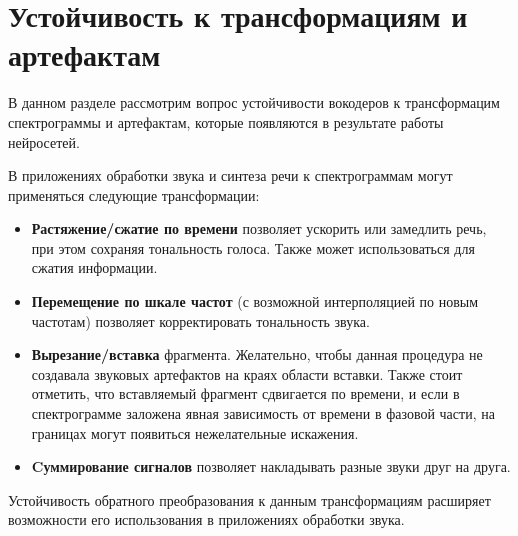 \section{Устойчивость к трансформациям и артефактам}

В данном разделе рассмотрим вопрос устойчивости вокодеров к трансформацим спектрограммы и артефактам, которые появляются в результате работы нейросетей.

В приложениях обработки звука и синтеза речи к спектрограммам могут применяться следующие трансформации:
\begin{itemize}
  \item \textbf{Растяжение/сжатие по времени} позволяет ускорить или замедлить речь, при этом сохраняя тональность голоса. Также может использоваться для сжатия информации.
  \item \textbf{Перемещение по шкале частот} (с возможной интерполяцией по новым частотам) позволяет корректировать тональность звука.
  \item \textbf{Вырезание/вставка} фрагмента. Желательно, чтобы данная процедура не создавала звуковых артефактов на краях области вставки. 
  Также стоит отметить, что вставляемый фрагмент сдвигается по времени, и если в спектрограмме заложена явная зависимость от времени в фазовой части, 
  на границах могут появиться нежелательные искажения.
  \item \textbf{Cуммирование сигналов} позволяет накладывать разные звуки друг на друга.
\end{itemize}
Устойчивость обратного преобразования к данным трансформациям расширяет возможности его использования в приложениях обработки звука.

